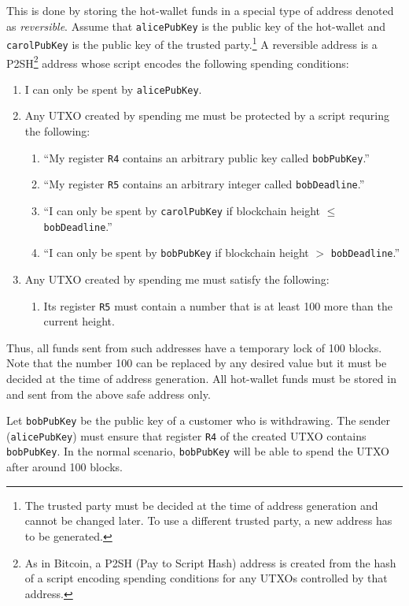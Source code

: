 \documentclass[11pt]{article}
\begin{document}
This is done by storing the hot-wallet funds in a special type of address denoted as {\em reversible}. Assume that \texttt{alicePubKey} is the public key of the hot-wallet and \texttt{carolPubKey} is the public key of the trusted party.\footnote{The trusted party must be decided at the time of address generation and cannot be changed later. To use a different trusted party, a new address has to be generated.} A reversible address is a P2SH\footnote{As in Bitcoin, a P2SH (Pay to Script Hash) address is created from the hash of a script encoding spending conditions for any UTXOs controlled by that address.} address whose script encodes the following spending conditions:   
\begin{enumerate}
	\item I can only be spent by \texttt{alicePubKey}.
	\item Any UTXO created by spending me must be protected by a script requring the following: 	
	\begin{enumerate}
		\item ``My register \texttt{R4} contains an arbitrary public key called \texttt{bobPubKey}.'' 
		\item ``My register \texttt{R5} contains an arbitrary integer called \texttt{bobDeadline}.'' 
		\item ``I can only be spent by \texttt{carolPubKey} if blockchain height $\leq$ \texttt{bobDeadline}.''
		\item ``I can only be spent by \texttt{bobPubKey} if blockchain height $>$ \texttt{bobDeadline}.''	
    \end{enumerate}  
	\item Any UTXO created by spending me must satisfy the following: 	
	\begin{enumerate}
		\item Its register \texttt{R5} must contain a number that is at least 100 more than the current height. 
	\end{enumerate}  
\end{enumerate}

Thus, all funds sent from such addresses have a temporary lock of 100 blocks. Note that the number 100 can be replaced by any desired value but it must be decided at the time of address generation. All hot-wallet funds must be stored in and sent from the above safe address only. 

Let \texttt{bobPubKey} be the public key of a customer who is withdrawing. The sender (\texttt{alicePubKey}) must ensure that register \texttt{R4} of the created UTXO contains \texttt{bobPubKey}. In the normal scenario, \texttt{bobPubKey} will be able to spend the UTXO after around 100 blocks. 
\end{document}

